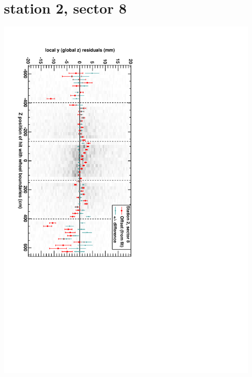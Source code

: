 \documentclass[compress]{beamer}
\begin{document}
\section*{station 2, sector 8}
\begin{frame} \vfill \mbox{\hspace{-1 cm}\includegraphics[height=1.2\linewidth, angle=90]{DTzVsZ_st2_sr08.pdf}} \end{frame}
\end{document}
